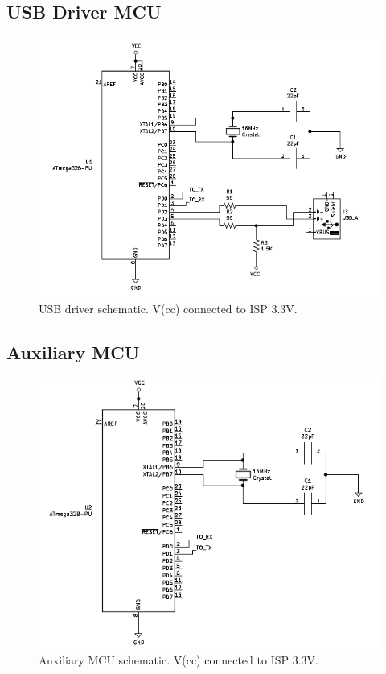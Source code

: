 \subsection{USB Driver MCU}
\label{sec:appd1}
\begin{figure}[H]
\centering
\includegraphics[width=0.9\columnwidth]{Figures/Fig_23.png}
\caption{USB driver schematic. V(cc) connected to ISP 3.3V.}
\label{fig:gantt}
\end{figure}
\subsection{Auxiliary MCU}
\label{sec:appd2}
\begin{figure}[H]
\centering
\includegraphics[width=0.9\columnwidth]{Figures/Fig_25.png}
\caption{Auxiliary MCU schematic. V(cc) connected to ISP 3.3V.}
\label{fig:gantt}
\end{figure}

